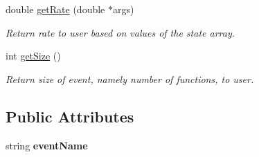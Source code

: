\begin{DoxyCompactItemize}
double \hyperlink{class_event_a2288e3b3fa19e076e04bba11b88d189a}{get\+Rate} (double $\ast$args)
\begin{DoxyCompactList}\small\item\em Return rate to user based on values of the state array. \end{DoxyCompactList}\item 
int \hyperlink{class_event_a1a0f2e2dc0b203f7be0f1d5b8810c6a2}{get\+Size} ()
\begin{DoxyCompactList}\small\item\em Return size of event, namely number of functions, to user. \end{DoxyCompactList}\end{DoxyCompactItemize}
\subsection*{Public Attributes}
\begin{DoxyCompactItemize}
\item 
\mbox{\label{class_event_acf8fc6215a0eeaa049e2aca9a347f4b0}} 
string {\bfseries event\+Name}
\end{DoxyCompactItemize}
